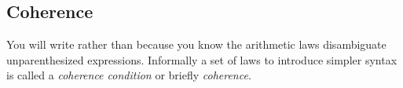 \subsection{Coherence}
You will write
rather than
because you know the arithmetic laws
disambiguate unparenthesized expressions.
Informally a set of laws to introduce simpler syntax is called a \emph{coherence condition} or briefly \emph{coherence}.

